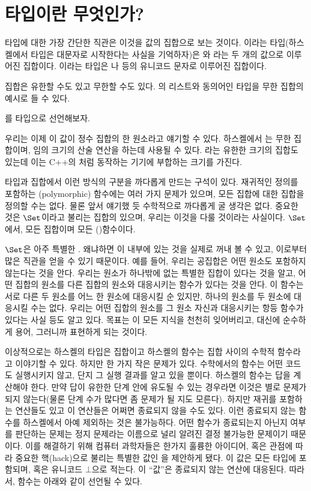 \section{타입이란 무엇인가?}

타입에 대한 가장 간단한 직관은 이것을 값의 집합으로 보는 것이다.
이라는 타입(하스켈에서 타입은 대문자로 시작한다는 사실을 기억하자)은 와 라는 두 개의 값으로 이루어진 집합이다.
이라는 타입은 나  등의 유니코드 문자로 이루어진 집합이다.

집합은 유한할 수도 있고 무한할 수도 있다. 의 리스트와 동의어인  타입을 무한 집합의 예시로 들 수 있다.

를  타입으로 선언해보자.

우리는 이제 이 값이 정수 집합의 한 원소라고 얘기할 수 있다.
하스켈에서 는 무한 집합이며, 임의 크기의 산술 연산을 하는데 사용될 수 있다. 라는 유한한 크기의 집합도 있는데 이는 C++의 처럼 동작하는 기기에 부합하는 크기를 가진다.

타입과 집합에서 이런 방식의 구분을 까다롭게 만드는 구석이 있다.
재귀적인 정의를 포함하는 \trPolymorphic(polymorphic) 함수에는 여러 가지 문제가 있으며, 모든 집합에 대한 집합을 정의할 수는 없다.
물론 앞서 얘기했 듯 수학적으로 까다롭게 굴 생각은 없다. 중요한 것은 $\Set$이라고 불리는 집합의 \trCategory\가 있으며, 우리는 이것을 다룰 것이라는 사실이다.
$\Set$에서, 모든 \trObject\는 집합이며 모든 \trMorphism(\trArrow)\은 함수이다.

$\Set$은 아주 특별한 . 왜냐하면 이  \trObject 내부에 있는 것을 실제로 꺼내 볼 수 있고, 이로부터 많은 직관을 얻을 수 있기 때문이다.
예를 들어, 우리는 공집합은 어떤 원소도 포함하지 않는다는 것을 안다. 우리는 원소가 하나밖에 없는 특별한 집합이 있다는 것을 알고, 어떤 집합의 원소를 다른 집합의 원소와 대응시키는 함수가 있다는 것을 안다.
이 함수는 서로 다른 두 원소를 어느 한 원소에 대응시킬 순 있지만, 하나의 원소를 두 원소에 대응시킬 수는 없다.
우리는 어떤 집합의 원소를 그 원소 자신과 대응시키는 항등 함수가 있다는 사실 등도 알고 있다.
목표는 이 모든 지식을 천천히 잊어버리고, 대신에 순수하게  용어, 그러니까 \trObject\와 \trArrow\로 표현하게 되는 것이다.

이상적으로는 하스켈의 타입은 집합이고 하스켈의 함수는 집합 사이의 수학적 함수라고 이야기할 수 있다.
하지만 한 가지 작은 문제가 있다. 수학에서의 함수는 어떤 코드도 실행시키지 않고, 단지 그 실행 결과를 알고 있을 뿐이다.
하스켈의 함수는 답을 계산해야 한다. 만약 답이 유한한 단계 안에 유도될 수 있는 경우라면 이것은 별로 문제가 되지 않는다(물론 단계 수가 많다면 좀 문제가 될 지도 모른다).
하지만 재귀를 포함하는 연산들도 있고 이 연산들은 어쩌면 종료되지 않을 수도 있다. 이런 종료되지 않는 함수를 하스켈에서 아예 제외하는 것은 불가능하다.
어떤 함수가 종료되는지 아닌지 여부를 판단하는 문제는 정지 문제라는 이름으로 널리 알려진 결정 불가능한 문제이기 때문이다.
이를 해결하기 위해 컴퓨터 과학자들은 한가지 훌륭한 아이디어, 혹은 관점에 따라 중요한 핵(hack)으로 불리는 특별한 값인 \newterm{\trBottom}을 제안하게 됐다.
이 값은 모든 타입에 포함되며, \code{\_|\_} 혹은 유니코드 $\bot$으로 적는다. 이 ``값''은 종료되지 않는 연산에 대응된다. 따라서, 함수는 아래와 같이 선언될 수 있다.

